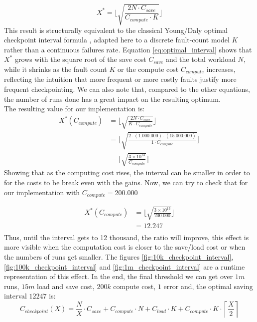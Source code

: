 \documentclass[11pt,a4paper]{report}
\begin{document}
\begin{equation}
X^* = \lfloor \sqrt{\frac{2 N \cdot C_{save}}{C_{compute} \cdot K}} \rfloor
\label{eq:optimal_interval}
\end{equation}
This result is structurally equivalent to the classical Young/Daly optimal
checkpoint interval formula \cite{DALY}, adapted
here to a discrete fault-count model $K$ rather than a continuous
failures rate. Equation \ref{eq:optimal_interval}
shows that $X^*$ grows with the square root of the save cost $C_{save}$ and
the total workload $N$, while it shrinks as the fault count $K$ or the
compute cost $C_{compute}$ increases, reflecting the intuition that more
frequent or more costly faults justify more frequent checkpointing.
We can also note that, compared to the other equations, the number of runs done has a great impact on the resulting optimum.
\\
The resulting value for our implementation is:
\begin{align*}
X^*(C_{compute}) &= \lfloor \sqrt{\frac{2 N \cdot C_{save}}{K \cdot C_{compute}}} \rfloor \\
&= \lfloor \sqrt{\frac{2 \cdot (1.000.000)\cdot(15.000.000)}{1 \cdot C_{compute}}} \rfloor\\
&= \lfloor \sqrt{\frac{3\times 10^{13}}{C_{compute}}} \rfloor
\label{eq:optimal_interval_vs_ccompute}
\end{align*}
Showing that as the computing cost rises, the interval can be smaller in order to for the costs to be break even with the gains.
Now, we can try to check that for our implementation with $C_{compute}{=}200.000$

\begin{align*}
X^*(C_{compute}) &= \lfloor \sqrt{\frac{3\times 10^{13}}{200.000}} \rfloor\\
&= 12.247\\
\end{align*}
Thus, until the interval gets to 12 thousand, the ratio will improve, this effect is more visible when the computation cost is closer to the save/load cost or when the numbers of runs get smaller.  
The figures \ref{fig:10k_checkpoint_interval}, \ref{fig:100k_checkpoint_interval} and \ref{fig:1m_checkpoint_interval} are a runtime representation of this effect.
In the end, the final threshold we can get over $1m$ runs, $15m$ load and save cost, $200k$ compute cost, $1$ error and, the optimal saving interval $12247$ is:
\begin{equation*}
C_{checkpoint}(X) = \frac{N}{X} \cdot C_{save} + C_{compute} \cdot N + C_{load} \cdot K + C_{compute} \cdot K \cdot \left\lceil \frac{X}{2} \right\rceil
\end{equation*}
\end{document}
